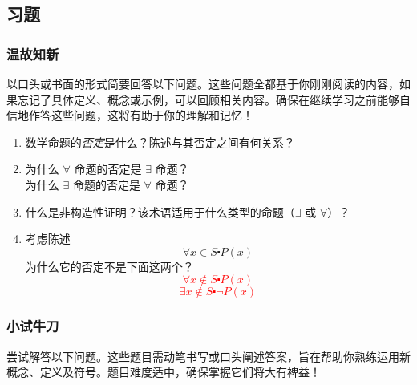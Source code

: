 \subsection{习题}

\subsubsection*{温故知新}

以口头或书面的形式简要回答以下问题。这些问题全都基于你刚刚阅读的内容，如果忘记了具体定义、概念或示例，可以回顾相关内容。确保在继续学习之前能够自信地作答这些问题，这将有助于你的理解和记忆！

\begin{enumerate}[label=(\arabic*)]
    \item 数学命题的\emph{否定}是什么？陈述与其否定之间有何关系？
    \item 为什么 $\forall$ 命题的否定是 $\exists$ 命题？\\
          为什么 $\exists$ 命题的否定是 $\forall$ 命题？
    \item 什么是非构造性证明？该术语适用于什么类型的命题（$\exists$ 或 $\forall$）？
    \item 考虑陈述
        \[\forall x \in S \centerdot P(x)\]
        为什么它的否定不是下面这两个？
        \textcolor{red}{
            \[\forall x \notin S \centerdot P(x)\]
            \[\exists x \notin S \centerdot \neg P(x)\]
        }
\end{enumerate}

\subsubsection*{小试牛刀}

尝试解答以下问题。这些题目需动笔书写或口头阐述答案，旨在帮助你熟练运用新概念、定义及符号。题目难度适中，确保掌握它们将大有裨益！

